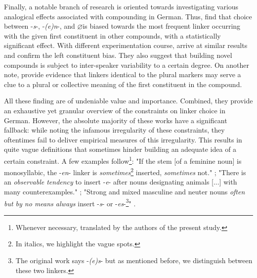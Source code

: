 \documentclass[10pt, a4paper]{article}
\newcommand{\zeroLinker}{\ensuremath{\boldsymbol{\varnothing}}}
\begin{document}
Finally, a notable branch of research is oriented towards investigating various analogical effects associated with compounding in German. Thus, \citet{krott_etal_2007} find that choice between -\textit{s}-, -\textit{(e)n}-, and \zeroLinker is biased towards the most frequent linker occurring with the given first constituent in other compounds, with a statistically significant effect. With different experimentation course, \citet{neef_borgwaldt_2012} arrive at similar results and confirm the left constituent bias. They also suggest that building novel compounds is subject to inter-speaker variability to a certain degree. On another note, \citet{schaefer_pankratz_2018} provide evidence that linkers identical to the plural markers may serve a clue to a plural or collective meaning of the first constituent in the compound.

All these finding are of undeniable value and importance. Combined, they provide an exhaustive yet granular overview of the constraints on linker choice in German. However, the absolute majority of these works have a significant fallback: while noting the infamous irregularity of these constraints, they oftentimes fail to deliver empirical measures of this irregularity. This results in quite vague definitions that sometimes hinder building an adequate idea of a certain constraint. A few examples follow\footnote{Whenever necessary, translated by the authors of the present study.}: "If the stem [of a feminine noun] is monosyllabic, the -\textit{en}- linker is \textit{sometimes}\footnote{In italics, we highlight the vague spots.} inserted, \textit{sometimes} not." \citep[229]{eisenberg_2013}; "There is an \textit{observable tendency} to insert -\textit{e}- after nouns designating animals [...] with many counterexamples." \citep[11]{nuebling_szczepaniak_2008}; "Strong and mixed masculine and neuter nouns \textit{often but by no means always} insert -\textit{s}- or -\textit{es}-\footnote{The original work says -\textit{(e)s}- but as mentioned before, we distinguish between these two linkers.}" \citep[229]{schaefer_2018}.
\end{document}
